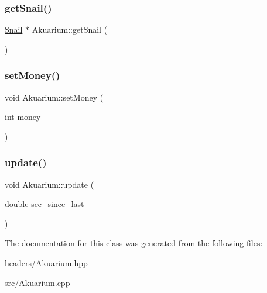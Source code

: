 \mbox{\label{class_akuarium_a846c24525e4bec5b355e34924d8a5784}} 
\subsubsection{\texorpdfstring{get\+Snail()}{getSnail()}}
{\footnotesize\ttfamily \mbox{\hyperlink{class_snail}{Snail}} $\ast$ Akuarium\+::get\+Snail (\begin{DoxyParamCaption}{ }\end{DoxyParamCaption})}

\mbox{\label{class_akuarium_a6be2d50883019668db71ef5128851202}} 
\subsubsection{\texorpdfstring{set\+Money()}{setMoney()}}
{\footnotesize\ttfamily void Akuarium\+::set\+Money (\begin{DoxyParamCaption}\item[{int}]{money }\end{DoxyParamCaption})}

\mbox{\label{class_akuarium_af7c9d5e5b90bd3c0cef6e91777bb3978}} 
\subsubsection{\texorpdfstring{update()}{update()}}
{\footnotesize\ttfamily void Akuarium\+::update (\begin{DoxyParamCaption}\item[{double}]{sec\+\_\+since\+\_\+last }\end{DoxyParamCaption})}



The documentation for this class was generated from the following files\+:\begin{DoxyCompactItemize}
\item 
headers/\mbox{\hyperlink{_akuarium_8hpp}{Akuarium.\+hpp}}\item 
src/\mbox{\hyperlink{_akuarium_8cpp}{Akuarium.\+cpp}}\end{DoxyCompactItemize}
